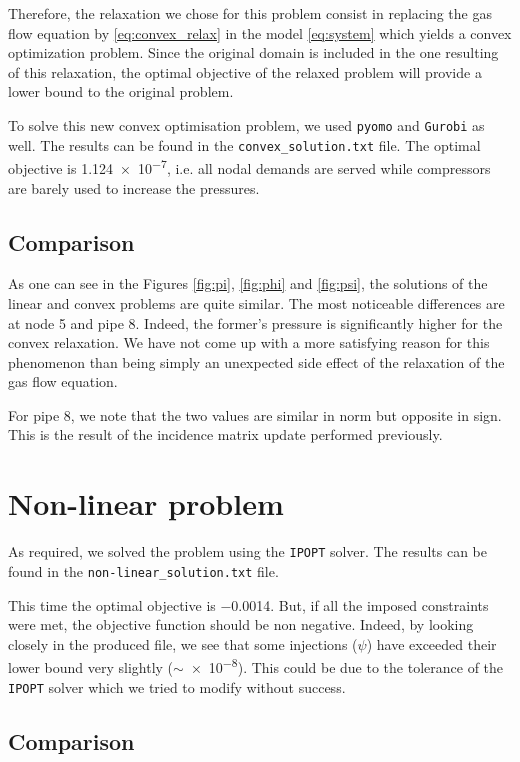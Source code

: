 \documentclass[a4paper, 12pt]{article}
\begin{document}
Therefore, the relaxation we chose for this problem consist in replacing the gas flow equation by \eqref{eq:convex_relax} in the model \eqref{eq:system} which yields a convex optimization problem. Since the original domain is included in the one resulting of this relaxation, the optimal objective of the relaxed problem will provide a lower bound to the original problem.

To solve this new convex optimisation problem, we used \texttt{pyomo} and \texttt{Gurobi} as well. The results can be found in the \texttt{convex\_solution.txt} file. The optimal objective is \num{1.124e-7}, i.e. all nodal demands are served while compressors are barely used to increase the pressures.

\subsection{Comparison}

As one can see in the Figures \ref{fig:pi}, \ref{fig:phi} and \ref{fig:psi}, the solutions of the linear and convex problems are quite similar. The most noticeable differences are at node 5 and pipe 8. Indeed, the former's pressure is significantly higher for the convex relaxation. We have not come up with a more satisfying reason for this phenomenon than being simply an unexpected side effect of the relaxation of the gas flow equation.

For pipe 8, we note that the two values are similar in norm but opposite in sign. This is the result of the incidence matrix update performed previously.

\section{Non-linear problem} \label{sec:non-linear}

As required, we solved the problem using the \texttt{IPOPT} solver. The results can be found in the \texttt{non-linear\_solution.txt} file.

This time the optimal objective is \num{-0.0014}. But, if all the imposed constraints were met, the objective function should be non negative. Indeed, by looking closely in the produced file, we see that some injections ($\psi$) have exceeded their lower bound very slightly ($\sim$\num{e-8}). This could be due to the tolerance of the \texttt{IPOPT} solver which we tried to modify without success.

\subsection{Comparison}
\end{document}
